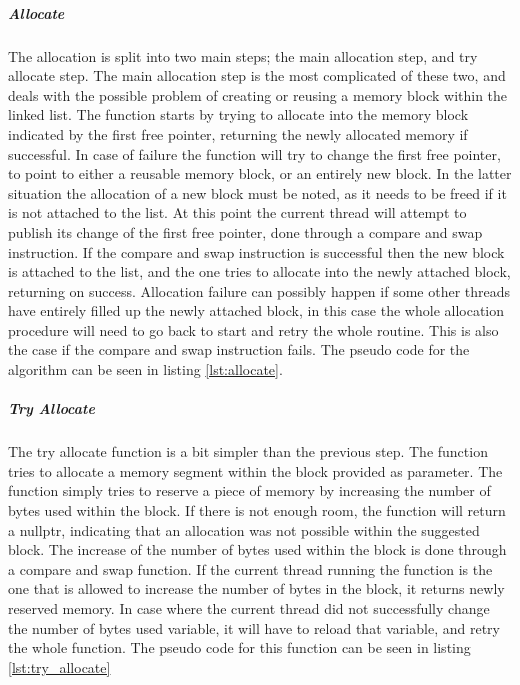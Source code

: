 \subparagraph{Allocate}
The allocation is split into two main steps; the main allocation step, and try allocate step.
The main allocation step is the most complicated of these two, and deals with
the possible problem of creating or reusing a memory block within the linked list.
The function starts by trying to allocate into the memory block indicated by the
first free pointer, returning the newly allocated memory if successful.
In case of failure the function will try to change the first free pointer, to
point to either a reusable memory block, or an entirely new block.
In the latter situation the allocation of a new block must be noted, as it needs to be freed if it is not attached to the list.
At this point the current thread will attempt to publish its change of the first
free pointer, done through a compare and swap instruction.
If the compare and swap instruction is successful then the new block is attached
to the list, and the one tries to allocate into the newly attached block, returning on success.
Allocation failure can possibly happen if some other threads have entirely filled up the newly attached block,
in this case the whole allocation procedure will need to go back to start and retry the whole routine.
This is also the case if the compare and swap instruction fails.
The pseudo code for the algorithm can be seen in listing \ref{lst:allocate}.


\subparagraph{Try Allocate}
The try allocate function is a bit simpler than the previous step. The function tries to allocate
a memory segment within the block provided as parameter.
The function simply tries to reserve a piece of memory by increasing the number of bytes used within the block.
If there is not enough room, the function will return a nullptr, indicating that an allocation was not possible within
the suggested block.
The increase of the number of bytes used within the block is done through a compare and swap function.
If the current thread running the function is the one that is allowed to increase the number of bytes in the block,
it returns newly reserved memory.
In case where the current thread did not successfully change the number of bytes used variable, it will have to reload
that variable, and retry the whole function. The pseudo code for this function can be seen in listing \ref{lst:try_allocate}


